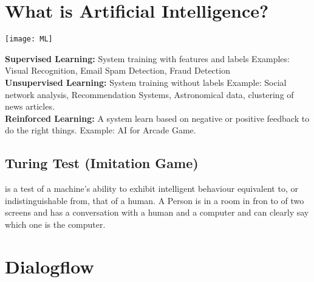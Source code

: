 \section{What is Artificial Intelligence?}

\begin{minipage}{0,5\linewidth}
	\texttt{[image: ML]}
\end{minipage}
\begin{minipage}{0,5\linewidth}
\textbf{Supervised Learning:} System training with features and labels Examples: Visual Recognition, Email Spam Detection, Fraud Detection \\
\textbf{Unsupervised Learning:} System training without labels Example: Social network analysis, Recommendation Systems, Astronomical data, clustering of news articles. \\
\textbf{Reinforced Learning:} A system learn based on negative or positive feedback to do the right things. Example: AI for Arcade Game. \\
\end{minipage}

\subsection{Turing Test (Imitation Game)}
is a test of a machine's ability to exhibit intelligent behaviour equivalent to, or indistinguishable from, that of a human. A Person is in a room in fron to of two screens and has a conversation with a human and a computer and can clearly say which one is the computer.
\section{Dialogflow}

